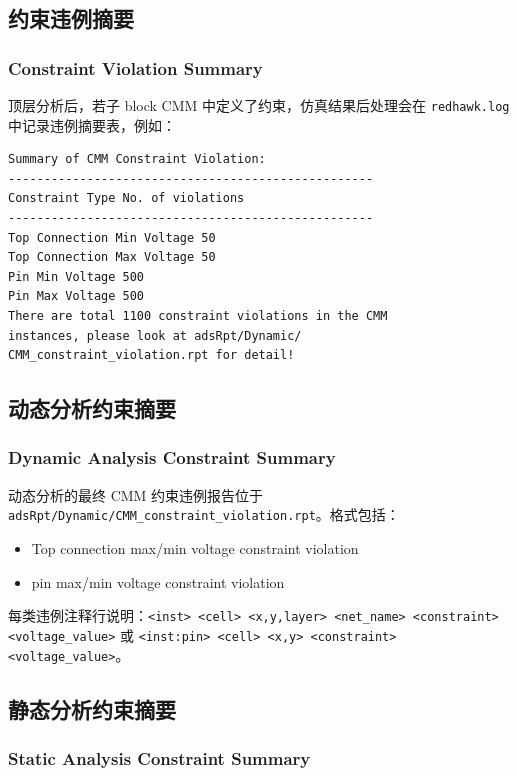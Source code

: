 \subsection{约束违例摘要}
\subsubsection*{Constraint Violation Summary}

顶层分析后，若子 block CMM 中定义了约束，仿真结果后处理会在 \texttt{redhawk.log} 中记录违例摘要表，例如：
\begin{lstlisting}
Summary of CMM Constraint Violation:
---------------------------------------------------
Constraint Type No. of violations
---------------------------------------------------
Top Connection Min Voltage 50
Top Connection Max Voltage 50
Pin Min Voltage 500
Pin Max Voltage 500
There are total 1100 constraint violations in the CMM
instances, please look at adsRpt/Dynamic/
CMM_constraint_violation.rpt for detail!
\end{lstlisting}

\subsection{动态分析约束摘要}
\subsubsection*{Dynamic Analysis Constraint Summary}

动态分析的最终 CMM 约束违例报告位于 \texttt{adsRpt/Dynamic/CMM\_constraint\_violation.rpt}。格式包括：
\begin{itemize}
  \item Top connection max/min voltage constraint violation
  \item pin max/min voltage constraint violation
\end{itemize}
每类违例注释行说明：\texttt{<inst> <cell> <x,y,layer> <net\_name> <constraint> <voltage\_value>} 或 \texttt{<inst:pin> <cell> <x,y> <constraint> <voltage\_value>}。

\subsection{静态分析约束摘要}
\subsubsection*{Static Analysis Constraint Summary}

